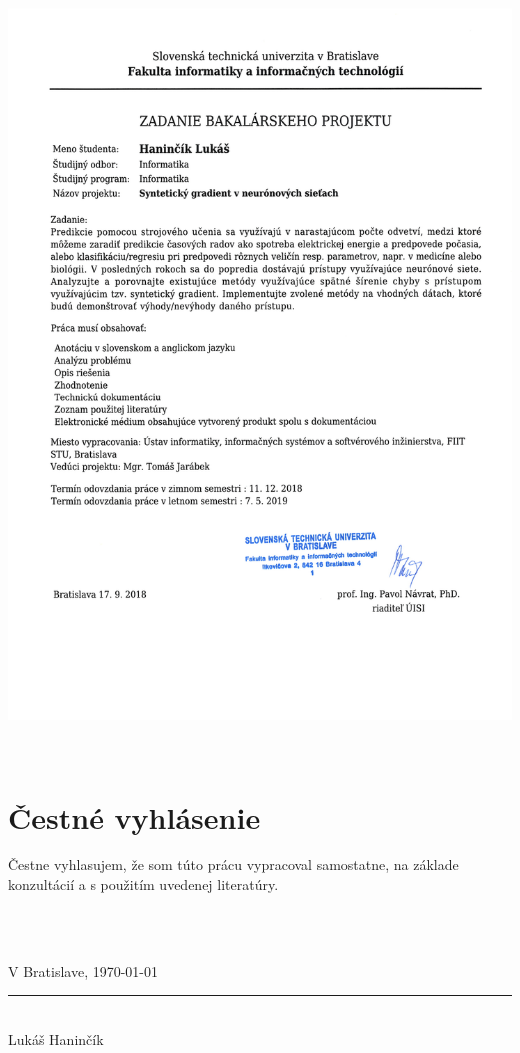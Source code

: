 \documentclass[12pt, twoside]{book}
\begin{document}
\newpage 
\afterpage{\null\thispagestyle{empty}\newpage}

\thispagestyle{empty}
\hspace{-3.5cm}\includegraphics[width=1.25\textwidth]{images/zadanie}


\frontmatter


\setcounter{page}{3}
\newpage 
~
\section*{Čestné vyhlásenie}
\vfill
Čestne vyhlasujem, že som túto prácu vypracoval samostatne, na základe konzultácií a s použitím uvedenej literatúry.

\parbox{\textwidth}{
    \centering\\
    \vspace{2cm}

    \parbox{7cm}{
      \centering
      \rule{0cm}{1pt}\\
      V Bratislave, \today
    }
    \hfill
    \parbox{7cm}{
      \centering
      \rule{5cm}{1pt}\\
       Lukáš Haninčík 
    }
}
\newpage 
\afterpage{\null\thispagestyle{empty}\newpage}
\end{document}
